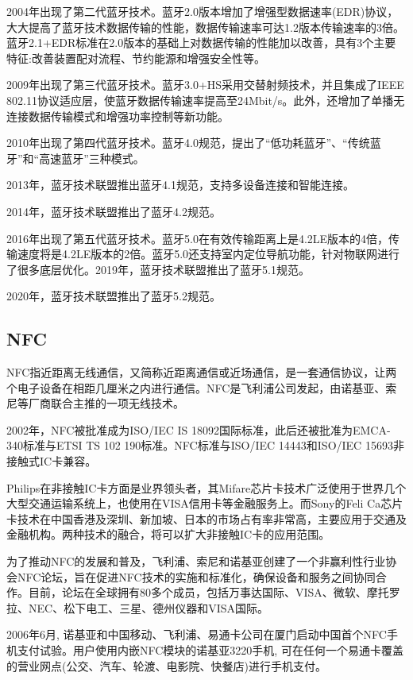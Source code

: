 \documentclass[lang=cn]{elegantpaper}
\begin{document}
2004年出现了第二代蓝牙技术。蓝牙2.0版本增加了增强型数据速率(EDR)协议，大大提高了蓝牙技术数据传输的性能，数据传输速率可达1.2版本传输速率的3倍。蓝牙2.1+EDR标准在2.0版本的基础上对数据传输的性能加以改善，具有3个主要特征:改善装置配对流程、节约能源和增强安全性等。

2009年出现了第三代蓝牙技术。蓝牙3.0+HS采用交替射频技术，并且集成了IEEE 802.11协议适应层，使蓝牙数据传输速率提高至24Mbit/s。此外，还增加了单播无连接数据传输模式和增强功率控制等新功能。

2010年出现了第四代蓝牙技术。蓝牙4.0规范，提出了“低功耗蓝牙”、“传统蓝牙”和“高速蓝牙”三种模式。

2013年，蓝牙技术联盟推出蓝牙4.1规范，支持多设备连接和智能连接。

2014年，蓝牙技术联盟推出了蓝牙4.2规范。\cite{BlueTooth}

2016年出现了第五代蓝牙技术。蓝牙5.0在有效传输距离上是4.2LE版本的4倍，传输速度将是4.2LE版本的2倍。蓝牙5.0还支持室内定位导航功能，针对物联网进行了很多底层优化。2019年，蓝牙技术联盟推出了蓝牙5.1规范。

2020年，蓝牙技术联盟推出了蓝牙5.2规范。

\subsection{NFC}

NFC指近距离无线通信，又简称近距离通信或近场通信，是一套通信协议，让两个电子设备在相距几厘米之内进行通信。NFC是飞利浦公司发起，由诺基亚、索尼等厂商联合主推的一项无线技术。

2002年，NFC被批准成为ISO/IEC IS 18092国际标准，此后还被批准为EMCA-340标准与ETSI TS 102 190标准。NFC标准与ISO/IEC 14443和ISO/IEC 15693非接触式IC卡兼容。

Philips在非接触IC卡方面是业界领头者，其Mifare芯片卡技术广泛使用于世界几个大型交通运输系统上，也使用在VISA信用卡等金融服务上。而Sony的Feli Ca芯片卡技术在中国香港及深圳、新加坡、日本的市场占有率非常高，主要应用于交通及金融机构。两种技术的融合，将可以扩大非接触IC卡的应用范围。

为了推动NFC的发展和普及，飞利浦、索尼和诺基亚创建了一个非赢利性行业协会NFC论坛，旨在促进NFC技术的实施和标准化，确保设备和服务之间协同合作。目前，论坛在全球拥有80多个成员，包括万事达国际、VISA、微软、摩托罗拉、NEC、松下电工、三星、德州仪器和VISA国际。\cite{BlueTooth2}

2006年6月, 诺基亚和中国移动、飞利浦、易通卡公司在厦门启动中国首个NFC手机支付试验。用户使用内嵌NFC模块的诺基亚3220手机, 可在任何一个易通卡覆盖的营业网点(公交、汽车、轮渡、电影院、快餐店)进行手机支付\cite{NFC}。
\end{document}
